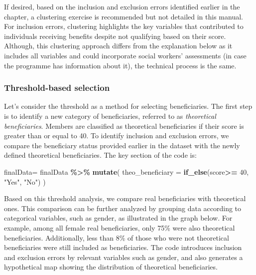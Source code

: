 \documentclass[
]{article}
\newenvironment{Shaded}{\begin{snugshade}}{\end{snugshade}}
\newcommand{\AttributeTok}[1]{\textcolor[rgb]{0.13,0.29,0.53}{#1}}
\newcommand{\DecValTok}[1]{\textcolor[rgb]{0.00,0.00,0.81}{#1}}
\newcommand{\FunctionTok}[1]{\textcolor[rgb]{0.13,0.29,0.53}{\textbf{#1}}}
\newcommand{\NormalTok}[1]{#1}
\newcommand{\OtherTok}[1]{\textcolor[rgb]{0.56,0.35,0.01}{#1}}
\newcommand{\SpecialCharTok}[1]{\textcolor[rgb]{0.81,0.36,0.00}{\textbf{#1}}}
\newcommand{\StringTok}[1]{\textcolor[rgb]{0.31,0.60,0.02}{#1}}
\begin{document}
If desired, based on the inclusion and exclusion errors identified
earlier in the chapter, a clustering exercise is recommended but not
detailed in this manual. For inclusion errors, clustering highlights the
key variables that contributed to individuals receiving benefits despite
not qualifying based on their score. Although, this clustering approach
differs from the explanation below as it includes all variables and
could incorporate social workers' assessments (in case the programme has
information about it), the technical process is the same.

\subsubsection{\texorpdfstring{\textbf{Threshold-based
selection}}{Threshold-based selection}}\label{threshold-based-selection}

Let's consider the threshold as a method for selecting beneficiaries.
The first step is to identify a new category of beneficiaries, referred
to as \emph{theoretical beneficiaries}. Members are classified as
theoretical beneficiaries if their score is greater than or equal to 40.
To identify inclusion and exclusion errors, we compare the beneficiary
status provided earlier in the dataset with the newly defined
theoretical beneficiaries. The key section of the code is:

\begin{Shaded}
\begin{Highlighting}[]

\NormalTok{finalData}\OtherTok{=}\NormalTok{ finalData }\SpecialCharTok{\%\textgreater{}\%} 
  \FunctionTok{mutate}\NormalTok{(}
    \AttributeTok{theo\_beneficiary =} \FunctionTok{if\_else}\NormalTok{(score}\SpecialCharTok{\textgreater{}=} \DecValTok{40}\NormalTok{, }\StringTok{"Yes"}\NormalTok{, }\StringTok{"No"}\NormalTok{)}
\NormalTok{  )}
\end{Highlighting}
\end{Shaded}

Based on this threshold analysis, we compare real beneficiaries with
theoretical ones. This comparison can be further analyzed by grouping
data according to categorical variables, such as gender, as illustrated
in the graph below. For example, among all female real beneficiaries,
only 75\% were also theoretical beneficiaries. Additionally, less than
8\% of those who were not theoretical beneficiaries were still included
as beneficiaries. The code introduces inclusion and exclusion errors by
relevant variables such as gender, and also generates a hypothetical map
showing the distribution of theoretical beneficiaries.
\end{document}
